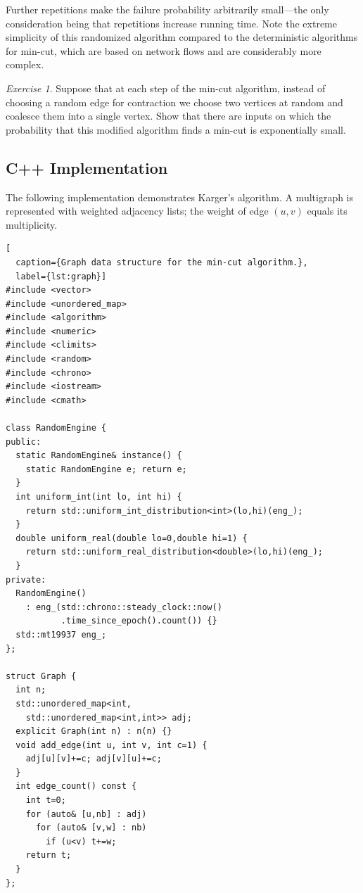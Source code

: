 \documentclass[twoside,12pt]{book}
\theoremstyle{plain}
\theoremstyle{definition}
\theoremstyle{remark}
\newtheorem{exercise}[theorem]{Exercise}
\begin{document}
Further repetitions make the failure probability arbitrarily small---the
only consideration being that repetitions increase running time. Note the
extreme simplicity of this randomized algorithm compared to the
deterministic algorithms for min-cut, which are based on network flows and
are considerably more complex.

\begin{exercise}
Suppose that at each step of the min-cut algorithm, instead of choosing a
random edge for contraction we choose two vertices at random and coalesce
them into a single vertex. Show that there are inputs on which the
probability that this modified algorithm finds a min-cut is exponentially
small.
\end{exercise}

\subsection{C++ Implementation}

The following implementation demonstrates Karger's algorithm.  A multigraph
is represented with weighted adjacency lists; the weight of edge $(u,v)$
equals its multiplicity.

\begin{lstlisting}[
  caption={Graph data structure for the min-cut algorithm.},
  label={lst:graph}]
#include <vector>
#include <unordered_map>
#include <algorithm>
#include <numeric>
#include <climits>
#include <random>
#include <chrono>
#include <iostream>
#include <cmath>

class RandomEngine {
public:
  static RandomEngine& instance() {
    static RandomEngine e; return e;
  }
  int uniform_int(int lo, int hi) {
    return std::uniform_int_distribution<int>(lo,hi)(eng_);
  }
  double uniform_real(double lo=0,double hi=1) {
    return std::uniform_real_distribution<double>(lo,hi)(eng_);
  }
private:
  RandomEngine()
    : eng_(std::chrono::steady_clock::now()
           .time_since_epoch().count()) {}
  std::mt19937 eng_;
};

struct Graph {
  int n;
  std::unordered_map<int,
    std::unordered_map<int,int>> adj;
  explicit Graph(int n) : n(n) {}
  void add_edge(int u, int v, int c=1) {
    adj[u][v]+=c; adj[v][u]+=c;
  }
  int edge_count() const {
    int t=0;
    for (auto& [u,nb] : adj)
      for (auto& [v,w] : nb)
        if (u<v) t+=w;
    return t;
  }
};
\end{lstlisting}
\end{document}
